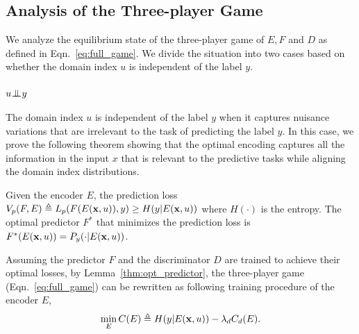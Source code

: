 \documentclass{article}
\newcommand{\lemref}[1]{Lemma~\ref{#1}}
\newcommand{\eqnref}[1]{Eqn.~\ref{#1}}
\begin{document}
\subsection{Analysis of the Three-player Game}

We analyze the equilibrium state of the three-player game of $E, F$ and $D$ as defined in \eqnref{eq:full_game}. 
We divide the situation into two cases based on whether the domain index $u$ is independent of the label $y$.

\subsubsection{$u {\;\bot\!\!\!\!\!\!\bot\;} y$}
The domain index $u$ is independent of the label $y$ when it captures nuisance variations that are irrelevant to the task of predicting the label $y$. In this case, we prove the following theorem showing that the optimal encoding captures all the information in the input $x$ that is relevant to the predictive tasks while aligning the domain index distributions.

\begin{lemma}
\label{thm:opt_predictor}
Given the encoder $E$, the prediction loss $V_p(F,E)\triangleq L_p(F(E({\bf x},u)),y) \geq H(y|E({\bf x},u))$ where $H(\cdot)$ is the entropy. The optimal predictor $F^*$ that minimizes the prediction loss is $F^*(E({\bf x},u))=P_y(\cdot|E({\bf x},u))$.
\end{lemma}

Assuming the predictor $F$ and the discriminator $D$ are trained to achieve their optimal losses, by \lemref{thm:opt_predictor}, the three-player game (\eqnref{eq:full_game}) can be rewritten as following training procedure of the encoder $E$,
\vspace{-1.5mm}
\begin{align}
\min_E C(E) \triangleq H(y|E({\bf x},u)) - \lambda_d C_d(E).
\end{align}
\end{document}
